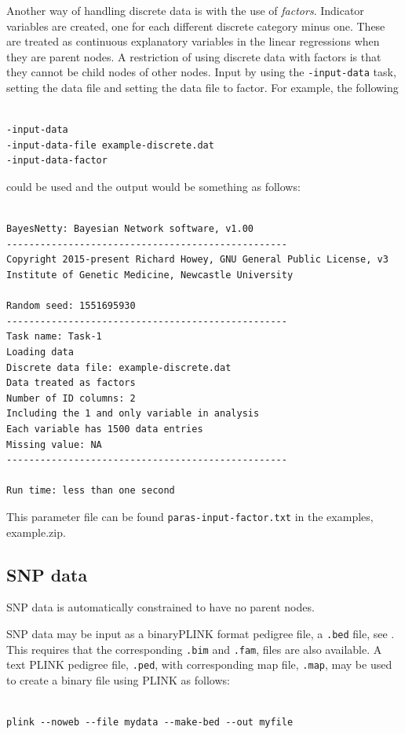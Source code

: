 \documentclass[a4paper,12pt]{article}
\newcommand{\code}[1]{{\footnotesize{{\tt #1}}}}
\begin{document}
Another way of handling discrete data is with the use of {\it factors}. Indicator variables are created, one for each different discrete category minus one. These are treated as continuous explanatory variables in the linear regressions when they are parent nodes. A restriction of using discrete data with factors is that they cannot be child nodes of other nodes. Input by using the \code{-input-data} task, setting the data file and setting the data file to factor. For example, the following 
\vspace{0.35cm} \begin{lstlisting}

-input-data
-input-data-file example-discrete.dat
-input-data-factor

\end{lstlisting} \vspace{0.35cm}
could be used and the output would be something as follows: 
\vspace{0.35cm} \begin{lstlisting}

BayesNetty: Bayesian Network software, v1.00
--------------------------------------------------
Copyright 2015-present Richard Howey, GNU General Public License, v3
Institute of Genetic Medicine, Newcastle University

Random seed: 1551695930
--------------------------------------------------
Task name: Task-1
Loading data
Discrete data file: example-discrete.dat
Data treated as factors
Number of ID columns: 2
Including the 1 and only variable in analysis
Each variable has 1500 data entries
Missing value: NA
--------------------------------------------------

Run time: less than one second

\end{lstlisting} \vspace{0.35cm}
This parameter file can be found \code{paras-input-factor.txt} in the examples, example.zip. 


\subsection{SNP data}
\label{input-data-snp}

SNP data is automatically constrained to have no parent nodes. 

SNP data may be input as a binaryPLINK format pedigree file, a \code{.bed} file, see \citet{purcell:etal:07}. This requires that the corresponding \code{.bim} and \code{.fam}, files are also available. A text PLINK pedigree file, \code{.ped}, with corresponding map file, \code{.map}, may be used to create a binary file using PLINK as follows: \vspace{0.35cm} \begin{lstlisting}

plink --noweb --file mydata --make-bed --out myfile

\end{lstlisting} \vspace{0.35cm}
\end{document}

